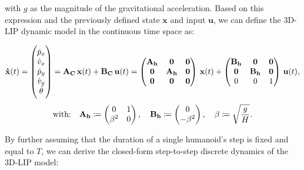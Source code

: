 with $g$ as the magnitude of the gravitational acceleration.
Based on this expression and the previously defined state $\mathbf{x}$ and input $\mathbf{u}$, we can define the 3D-LIP dynamic model in the continuous time space as:


\begin{equation} \notag
\mathbf{\dot{x}}(t) = 
\begin{pmatrix}
    \dot{p}_{x}\\
    \dot{v}_{x}\\
    \dot{p}_{y}\\
    \dot{v}_{y}\\
    \dot{\theta}
\end{pmatrix} =
\mathbf{A_C} \, \mathbf{x}(t) + \mathbf{B_C} \, \mathbf{u}(t) =
\begin{pmatrix}
    \mathbf{A_h} & \mathbf{0} & \mathbf{0} \\
    \mathbf{0} & \mathbf{A_h} & \mathbf{0} \\
    \mathbf{0} & \mathbf{0} & \mathbf{0} \\
\end{pmatrix} \, \mathbf{x}(t) +
\begin{pmatrix}
    \mathbf{B_h} & \mathbf{0} & \mathbf{0} \\
    \mathbf{0} & \mathbf{B_h} & \mathbf{0} \\
    0 & 0 & 1\\
\end{pmatrix} \, \mathbf{u}(t),
\end{equation}
\begin{equation} \notag
\text{with:}\quad
\mathbf{A_h} \coloneq
\begin{pmatrix}
    0 & 1 \\
    \beta^2 & 0
\end{pmatrix},
\quad
\mathbf{B_h} \coloneq
\begin{pmatrix}
    0 \\
    -\beta^2
\end{pmatrix}, \quad
\beta \coloneqq \sqrt{\frac{g}{H}}.
\end{equation}

By further assuming that the duration of a single humanoid's step is fixed and equal to $T$, we can derive the closed-form step-to-step discrete dynamics of the 3D-LIP model:


